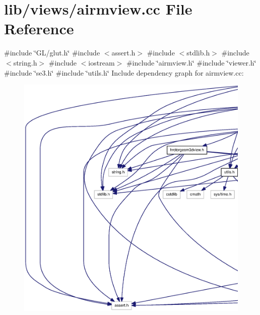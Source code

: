 \section{lib/views/airmview.cc \-File \-Reference}
\label{airmview_8cc}
{\ttfamily \#include \char`\"{}\-G\-L/glut.\-h\char`\"{}}\*
{\ttfamily \#include $<$assert.\-h$>$}\*
{\ttfamily \#include $<$stdlib.\-h$>$}\*
{\ttfamily \#include $<$string.\-h$>$}\*
{\ttfamily \#include $<$iostream$>$}\*
{\ttfamily \#include \char`\"{}airmview.\-h\char`\"{}}\*
{\ttfamily \#include \char`\"{}viewer.\-h\char`\"{}}\*
{\ttfamily \#include \char`\"{}se3.\-h\char`\"{}}\*
{\ttfamily \#include \char`\"{}utils.\-h\char`\"{}}\*
\-Include dependency graph for airmview.\-cc\-:\nopagebreak
\begin{figure}[H]
\begin{center}
\leavevmode
\includegraphics[width=350pt]{airmview_8cc__incl}
\end{center}
\end{figure}

